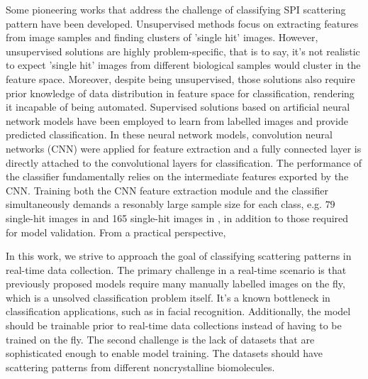 Some pioneering works that address the challenge of classifying SPI scattering
pattern have been developed.  Unsupervised methods
\cite{yoonUnsupervisedClassificationSingleparticle2011,
giannakisSymmetriesImageFormation2012,schwanderSymmetriesImageFormation2012,
yoonNovelAlgorithmsCoherent2012,
andreassonAutomatedIdentificationClassification2014,
bobkovSortingAlgorithmsSingleparticle2015} focus on extracting features from
image samples and finding clusters of 'single hit' images.  However,
unsupervised solutions are highly problem-specific, that is to say, it's not
realistic to expect 'single hit' images from different biological samples would
cluster in the feature space.  Moreover, despite being unsupervised, those
solutions also require prior knowledge of data distribution in feature space for
classification, rendering it incapable of being automated. Supervised solutions
based on artificial neural network models
\cite{shiEvaluationPerformanceClassification2019,
ignatenkoClassificationDiffractionPatterns2021} have been employed to learn from
labelled images and provide predicted classification.  In these neural network
models, convolution neural networks (CNN) were applied for feature extraction
and a fully connected layer is directly attached to the convolutional layers for
classification.  The performance of the classifier fundamentally relies on the
intermediate features exported by the CNN.  Training both the CNN feature
extraction module and the classifier simultaneously demands a resonably large
sample size for each class, e.g. $79$ single-hit images in
\cite{shiEvaluationPerformanceClassification2019} and 165 single-hit images in
\cite{ignatenkoClassificationDiffractionPatterns2021}, in addition to those
required for model validation.  From a practical perspective, 



In this work, we strive to approach the goal of classifying scattering patterns
in real-time data collection.  The primary challenge in a real-time scenario is
that previously proposed models require many manually labelled images on the fly,
which is a unsolved classification problem itself.  It's a known bottleneck in
classification applications, such as in facial recognition.  Additionally, the
model should be trainable prior to real-time data collections instead of having
to be trained on the fly. The second challenge is the lack of datasets that are
sophisticated enough to enable model training. The datasets should have
scattering patterns from different noncrystalline biomolecules.  


